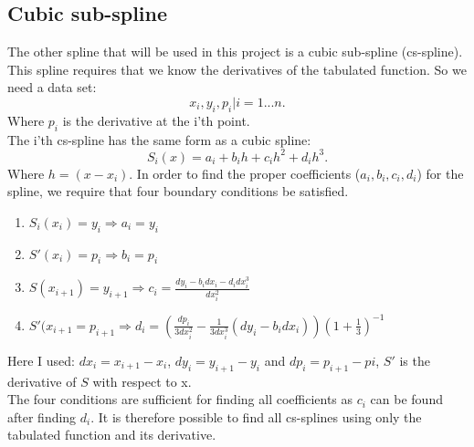 \documentclass{article}
\begin{document}
\subsection{Cubic sub-spline}
The other spline that will be used in this project is a cubic sub-spline (cs-spline). This spline requires 
that we know the derivatives of the tabulated function. So we need a data set:
\begin{equation}
\label{eq:cs1}
x_i,y_i,p_i | i=1...n.
\end{equation}
Where $p_i$ is the derivative at the i'th point.
\\
The i'th cs-spline has the same form as a cubic spline:
\begin{equation}
\label{eq:cs2}
S_i(x)=a_i+b_i h + c_i h^2 +d_i h^3.
\end{equation}
Where $h=(x-x_i)$.
In order to find the proper coefficients ($a_i, b_i, c_i, d_i$) for the spline, we require that four boundary conditions be 
satisfied.
\begin{enumerate}
\item $S_i(x_i)=y_i \Rightarrow a_i=y_i$
\item $S'(x_i) = p_i \Rightarrow b_i=p_i$
\item $S(x_{i+1}) = y_{i+1} \Rightarrow c_i = \frac{dy_i-b_i dx_i -d_i dx_i^3}{dx_i^2}$
\item $S'(x_{i+1} = p_{i+1} \Rightarrow d_i = \left(\frac{dp_i}{3 dx_i^2}-\frac{1}{3 dx_i^3}(dy_i-b_i dx_i)
\right) \left(1+\frac{1}{3}\right)^{-1}$
\end{enumerate}
Here I used: $dx_i=x_{i+1}-x_i$, $dy_i=y_{i+1}-y_i$ and $dp_i=p_{i+1}-p{i}$, $S'$ is the derivative of 
$S$ with respect to x.
\\
The four conditions are sufficient for finding all coefficients as 
$c_i$ can be found after finding $d_i$. It is therefore possible to find all 
cs-splines using only the tabulated function and its derivative.
 
\end{document}
